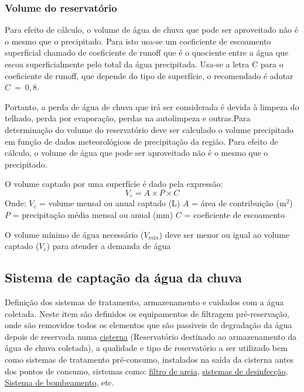 \subsubsection{Volume do reservatório}

Para efeito de cálculo, o volume de água de chuva que pode ser aproveitado não é o mesmo que o precipitado. Para isto usa-se um coeficiente de escoamento superficial chamado de coeficiente de runoff que é o quociente entre a água que escoa superficialmente pelo total da água precipitada. Usa-se a letra C para o coeficiente de runoff, que depende do tipo de superfície, o recomendado é adotar $C\ =\ 0,8$.

	Portanto, a perda de água de chuva que irá ser considerada é devida à limpeza do telhado, perda por evaporação, perdas na autolimpeza e outras.Para determinação do volume do reservatório deve ser calculado o volume precipitado em função de dados meteorológicos de precipitação da região. Para efeito de cálculo, o volume de água que pode ser aproveitado não é o mesmo que o precipitado.
	
	O volume captado por uma superfície é dado pela expressão:
$$V_c = A\times P\times C$$
Onde:
$V_c$ = volume mensal ou anual captado (\si{\liter})
$A$ = área de contribuição ($\si{\meter}^{2}$)
$P$ = precipitação média mensal ou anual (\si{\milli\meter})
$C$ = coeficiente de escoamento

	O volume mínimo de água necessário ($V_{mín}$) deve ser menor ou igual ao volume
captado ($V_c$) para atender a demanda de água

\subsection{Sistema de captação da água da chuva}

	Definição dos sistemas de tratamento, armazenamento e cuidados com a água
coletada. Neste item são definidos os equipamentos de filtragem pré-reservação, onde são removidos todos os elementos que são passiveis de degradação da água depois de reservada numa \uline{cisterna} (Reservatório destinado ao armazenamento da água de chuva coletada), a qualidade e tipo de reservatório a ser utilizado bem como sistemas de tratamento pré-consumo, instalados na saída da cisterna antes dos pontos de consumo, sistemas como: \uline{filtro de areia}, \uline{sistemas de desinfecção}, \uline{Sistema de bombeamento}, etc.

